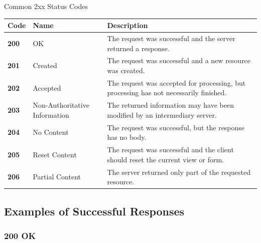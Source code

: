 \documentclass[a4paper]{article}
\begin{document}
        \begin{statuscategory}{Common 2xx Status Codes}
            \begin{longtable}{
                    >{\ttfamily\bfseries}p{1.5cm}
                p{4cm}
                p{8cm}
            }
                \toprule
                \textnormal{\textbf{Code}} &
                \textbf{Name} &
                \textbf{Description} \\
                \midrule
                200 &
                OK &
                The request was successful and the server returned a response. \\
                
                201 &
                Created &
                The request was successful and a new resource was created. \\
                
                202 &
                Accepted &
                The request was accepted for processing, but processing has not necessarily
                finished. \\
                
                203 &
                Non-Authoritative Information &
                The returned information may have been modified by an intermediary server. \\
                
                204 &
                No Content &
                The request was successful, but the response has no body. \\
                
                205 &
                Reset Content &
                The request was successful and the client should reset the current view or form. \\
                
                206 &
                Partial Content &
                The server returned only part of the requested resource. \\
                \bottomrule
            \end{longtable}
        \end{statuscategory}
        
        \subsection{Examples of Successful Responses}
            
            \subsubsection{200 OK}
                
\end{document}
